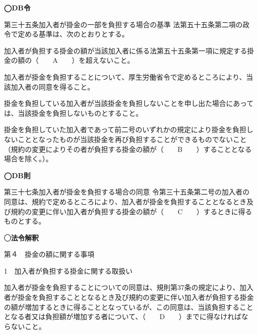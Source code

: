 \begin{fillblank}[自作 2026/11/7]
    \noindent \textbf{◯DB令}
  \begin{lawstructure}
    \begin{lawarticle}{第三十五条}{加入者が掛金の一部を負担する場合の基準}
      法第五十五条第二項の政令で定める基準は、次のとおりとする。

加入者が負担する掛金の額が当該加入者に係る法第五十五条第一項に規定する掛金の額の（　　A　　）を超えないこと。
      
加入者が掛金を負担することについて、厚生労働省令で定めるところにより、当該加入者の同意を得ること。

掛金を負担している加入者が当該掛金を負担しないことを申し出た場合にあっては、当該掛金を負担しないものとすること。

掛金を負担していた加入者であって前二号のいずれかの規定により掛金を負担しないこととなったものが当該掛金を再び負担することができるものでないこと（規約の変更によりその者が負担する掛金の額が（　　B　　）することとなる場合を除く。）。

    \end{lawarticle}
  \end{lawstructure}

  \noindent \textbf{◯DB則}
  \begin{lawstructure}
    \begin{lawarticle}{第三十七条}{加入者が掛金を負担する場合の同意}
      令第三十五条第二号の加入者の同意は、規約で定めるところにより、加入者が掛金を負担することとなるとき及び規約の変更に伴い加入者が負担する掛金の額が（　　C　　）するときに得るものとする。
    \end{lawarticle}
  \end{lawstructure}


  \noindent \textbf{◯法令解釈}
  \begin{lawstructure}
    \begin{lawarticle}{}{}
      第４　掛金の額に関する事項

      1　加入者が負担する掛金に関する取扱い

      加入者が掛金を負担することについての同意は、規則第37条の規定により、加入者が掛金を負担することとなるとき及び規約の変更に伴い加入者が負担する掛金の額が増加するときに得ることとなっているが、この同意は、当該負担することとなる者又は負担額が増加する者について、（　　D　　）までに得なければならないこと。


\end{lawarticle}
\end{lawstructure}
\end{fillblank}
